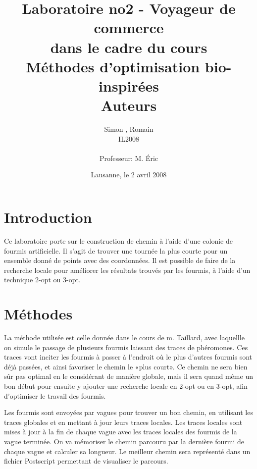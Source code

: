 \documentclass[a4paper, 11pt]{article}
\title{ %
\vspace{2cm}
\Huge{Laboratoire no2 - Voyageur de commerce} \\ \vspace{2.5cm} 
\small{dans le cadre du cours} \\
\vspace{1cm} 
\Large{Méthodes d'optimisation bio-inspirées}\\
\vspace{6cm}
\small{Auteurs}
}
\author{Simon \bsc{Hintermann}, Romain \bsc{de Wolff} \\ IL2008 \\ \vspace{0.7cm} \\ 
Professeur: M. Éric \bsc{Taillard} \vspace{0.5cm}}
\date{Lausanne, le 2 avril 2008}  %
\begin{document}
\maketitle
\thispagestyle{empty} %
\newpage
\tableofcontents
\newpage
 \setcounter{page}{1} 

{\setlength{\baselineskip}{1.2\baselineskip}
\parskip=10pt

\section{Introduction}

	Ce laboratoire porte sur le construction de chemin à l'aide d'une colonie de fourmis artificielle. Il s'agit de trouver une tournée la plus courte pour un ensemble donné de points avec des coordonnées. Il est possible de faire de la recherche locale pour améliorer les résultats trouvés par les fourmis, à l'aide d'un technique 2-opt ou 3-opt.

\section{Méthodes}

	La méthode utilisée est celle donnée dans le cours de m. Taillard, avec laquellle on simule le passage de plusieurs fourmis laissant des traces de phéromones. Ces traces vont inciter les fourmis à passer à l'endroit où le plus d'autres fourmis sont déjà passées, et ainsi favoriser le chemin le «plus court». Ce chemin ne sera bien sûr pas optimal en le considérant de manière globale, mais il sera quand même un bon début pour ensuite y ajouter une recherche locale en 2-opt ou en 3-opt, afin d'optimiser le travail des fourmis.

	Les fourmis sont envoyées par vagues pour trouver un bon chemin, en utilisant les traces globales et en mettant à jour leurs traces locales. Les traces locales sont mises à jour à la fin de chaque vague avec les traces locales des fourmis de la vague terminée. On va mémoriser le chemin parcouru par la dernière fourmi de chaque vague et calculer sa longueur. Le meilleur chemin sera représenté dans un fichier Postscript permettant de visualiser le parcours.

}
\end{document}
